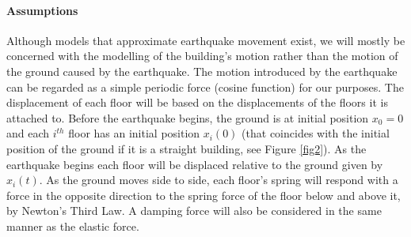 \documentclass{article}
\begin{document}
			\paragraph{Assumptions} Although models that approximate earthquake movement exist, we will mostly be concerned with the modelling of the building's motion rather than the motion of the ground caused by the earthquake. The motion introduced by the earthquake can be regarded as a simple periodic force (cosine function) for our purposes. The displacement of each floor will be based on the displacements of the floors it is attached to. Before the earthquake begins, the ground is at initial position $x_0 = 0$ and each $i^{th}$ floor has an initial position $x_i(0)$ (that coincides with the initial position of the ground if it is a straight building, see Figure \ref{fig2}). As the earthquake begins each floor will be displaced relative to the ground given by $x_i(t)$. As the ground moves side to side, each floor’s spring will respond with a force in the opposite direction to the spring force of the floor below and above it, by Newton’s Third Law. A damping force will also be considered in the same manner as the elastic force. 
				
\end{document}

